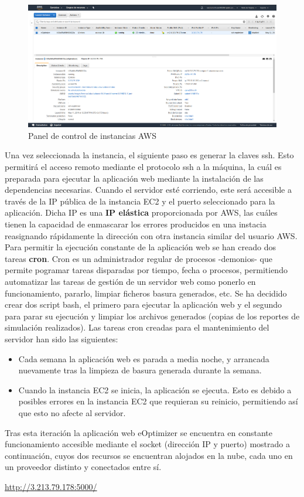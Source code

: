 \begin{figure}[H]
            \centering
            \includegraphics[width=17cm]{figs/aws_control_panel.png}
            \caption{Panel de control de instancias AWS}
            \label{fig:AWSControlPanel}
\end{figure}

Una vez seleccionada la instancia, el siguiente paso es generar la claves ssh. Esto permitirá el acceso remoto mediante el protocolo ssh a la máquina, la cuál es preparada para ejecutar la aplicación web mediante la instalación de las dependencias necesarias. Cuando el servidor esté corriendo, este será accesible a través de la IP pública de la instancia EC2 y el puerto seleccionado para la aplicación. Dicha IP es una \textbf{IP elástica} proporcionada por AWS, las cuáles tienen la capacidad de enmascarar los errores producidos en una instacia reasignando rápidamente la dirección con otra instancia similar del usuario AWS.\\
Para permitir la ejecución constante de la aplicación web se han creado dos tareas \textbf{cron}. Cron es un administrador regular de procesos -demonios- que permite pogramar tareas disparadas por tiempo, fecha o procesos, permitiendo automatizar las tareas de gestión de un servidor web como ponerlo en funcionamiento, pararlo, limpiar ficheros basura generados, etc. Se ha decidido crear dos script bash, el primero para ejecutar la aplicación web y el segundo para parar su ejecución y limpiar los archivos generados (copias de los reportes de simulación realizados). Las tareas cron creadas para el mantenimiento del servidor han sido las siguientes:
\begin{itemize}
\item Cada semana la aplicación web es parada a media noche, y arrancada nuevamente tras la limpieza de basura generada durante la semana.
\item Cuando la instancia EC2 se inicia, la aplicación se ejecuta. Esto es debido a posibles errores en la instancia EC2 que requieran su reinicio, permitiendo así que esto no afecte al servidor.
\end{itemize}

Tras esta iteración la aplicación web eOptimizer se encuentra en constante funcionamiento accesible mediante el socket (dirección IP y puerto) mostrado a continuación, cuyos dos recursos se encuentran alojados en la nube, cada uno en un proveedor distinto y conectados entre sí.\\

\centerline{\url{http://3.213.79.178:5000/}}
